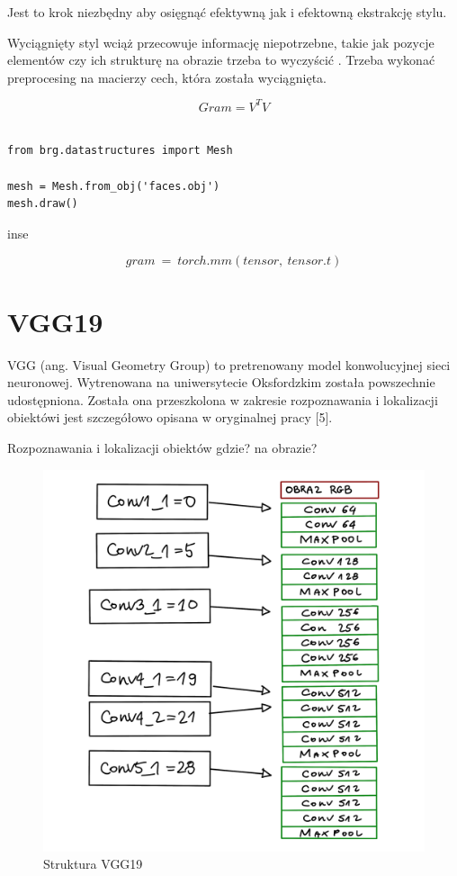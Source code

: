 \documentclass[brudnopis]{xmgr}
\begin{document}
Jest to krok niezbędny aby osięgnąć efektywną jak i efektowną ekstrakcję stylu.

Wyciągnięty styl wciąż przecowuje informację niepotrzebne, takie jak pozycje elementów czy ich strukturę na obrazie trzeba to wyczyścić .
Trzeba wykonać preprocesing na macierzy cech, która została wyciągnięta.

\begin{equation}
Gram = V^TV
\end{equation}


\begin{lstlisting}

from brg.datastructures import Mesh
 
mesh = Mesh.from_obj('faces.obj')
mesh.draw()
\end{lstlisting}
inse

\begin{equation}
gram\:=\:torch.mm (tensor,\:tensor.t)
\end{equation}




\section{VGG19\label{s:dsssl}}

VGG (ang. Visual Geometry Group) to pretrenowany model konwolucyjnej sieci neuronowej. 
Wytrenowana na uniwersytecie Oksfordzkim została powszechnie udostępniona. Została ona  przeszkolona w zakresie rozpoznawania i lokalizacji obiektówi jest szczegółowo opisana w oryginalnej pracy [5].

Rozpoznawania i lokalizacji obiektów gdzie? na obrazie?

\begin{figure}[!tbh]
\centering
\includegraphics[width=.8\hsize]{fig/7}
\caption{Struktura VGG19\label{RYS.4}}
\end{figure}
\end{document}
